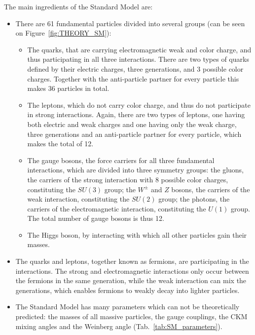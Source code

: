 The main ingredients of the Standard Model are:
\begin{itemize}
\item There are 61 fundamental particles divided into several groups (can be seen on Figure~\ref{fig:THEORY_SM}):
\begin{itemize}
\item The quarks, that are carrying electromagnetic weak and color charge, and thus participating in all three interactions. There are two types of quarks defined by their electric charges, three generations, and 3 possible color charges. Together with the anti-particle partner for every particle this makes 36 particles in total.
\item The leptons, which do not carry color charge, and thus do not participate in strong interactions. Again, there are two types of leptons, one having both electric and weak charges and one having only the weak charge, three generations and an anti-particle partner for every particle, which makes the total of 12.
\item The gauge bosons, the force carriers for all three fundamental interactions, which are divided into three symmetry groups: the gluons, the carriers of the strong interaction with 8 possible color charges, constituting the $SU(3)$ group; the $W^{\pm}$ and $Z$ bosons, the carriers of the weak interaction, constituting the $SU(2)$ group; the photons, the carriers of the electromagnetic interaction, constituting the $U(1)$ group. The total number of gauge bosons is thus 12.
\item The Higgs boson, by interacting with which all other particles gain their masses.
\end{itemize}
\item The quarks and leptons, together known as fermions, are participating in the interactions. The strong and electromagnetic interactions only occur between the fermions in the same generation, while the weak interaction can mix the generations, which enables fermions to weakly decay into lighter particles.
\item The Standard Model has many parameters which can not be theoretically predicted: the masses of all massive particles, the gauge couplings, the CKM mixing angles and the Weinberg angle (Tab.~\ref{tab:SM_parameters}).
\end{itemize}

